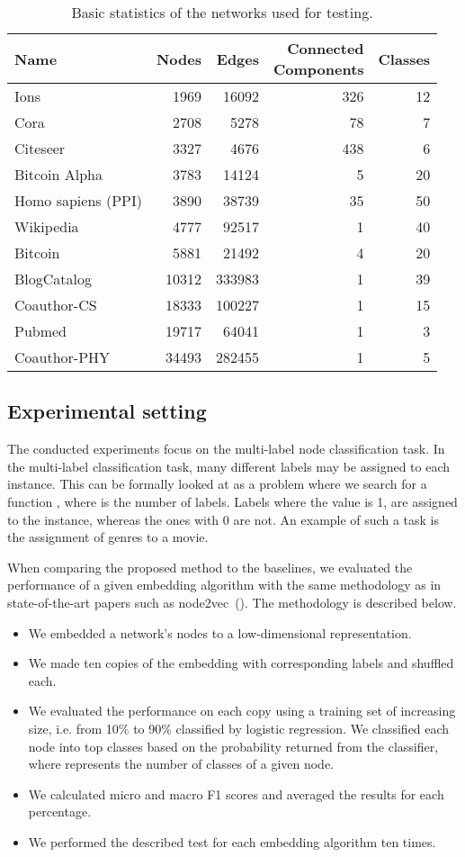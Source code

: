 \documentclass[twoside,11pt]{article}
\begin{document}
\begin{table}
\centering
\caption{Basic statistics of the networks used for testing.}
\begin{tabular}{lrrrr}
\hline
Name & Nodes & Edges & \makecell{Connected \\ Components} & Classes\\
\hline
Ions&   1969&   16092&  326&    12\\
Cora&   2708&   5278&   78& 7\\
Citeseer&   3327&   4676&   438&    6\\
Bitcoin Alpha&    3783&   14124&  5&  20\\
Homo sapiens (PPI)&   3890&   38739&  35& 50\\
Wikipedia&    4777&   92517&  1&  40\\
Bitcoin&    5881&   21492&  4&  20\\
BlogCatalog&    10312&  333983& 1&  39\\
Coauthor-CS&    18333& 100227& 1& 15\\
Pubmed& 19717&  64041&  1&  3\\
Coauthor-PHY&    34493& 282455& 1& 5\\
\hline
\end{tabular}
\label{tab1}
\end{table}

\subsection{Experimental setting}
The conducted experiments focus on the multi-label node classification task. In the multi-label classification task, many different labels may be assigned to each instance. This can be formally looked at as a problem where we search for a function , where  is the number of labels. Labels where the value is 1, are assigned to the instance, whereas the ones with 0 are not. An example of such a task is the assignment of genres to a movie.

When comparing the proposed method to the baselines, we evaluated the performance of a given embedding algorithm with the same methodology as in state-of-the-art papers such as node2vec~(\cite{grover2016node2vec}). The methodology is described below.

\begin{itemize}
\item We embedded a network's nodes to a low-dimensional representation.
\item We made ten copies of the embedding with corresponding labels and shuffled each.
\item We evaluated the performance on each copy using a training set of increasing size, i.e. from 10\% to 90\% classified by logistic regression. We classified each node into top  classes based on the probability returned from the classifier, where  represents the number of classes of a given node.
\item We calculated micro and macro F1 scores and averaged the results for each percentage.
\item We performed the described test for each embedding algorithm ten times.
\end{itemize}
\end{document}
